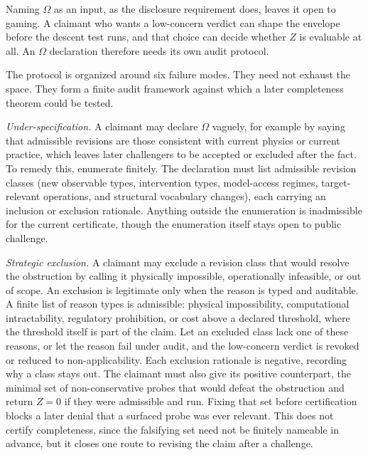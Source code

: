 \documentclass[11pt]{article}
\begin{document}
Naming $\Omega$ as an input, as the disclosure requirement does, leaves it open
to gaming. A claimant who wants a low-concern verdict can shape the envelope
before the descent test runs, and that choice can decide whether $Z$ is
evaluable at all. An $\Omega$ declaration therefore needs its own audit
protocol.

The protocol is organized around six failure modes. They need not exhaust the
space. They form a finite audit framework against which a later completeness
theorem could be tested.

\emph{Under-specification.} A claimant may declare $\Omega$ vaguely, for example
by saying that admissible revisions are those consistent with current physics or
current practice, which leaves later challengers to be accepted or excluded
after the fact. To remedy this, enumerate finitely. The declaration must list
admissible revision classes (new observable types, intervention types,
model-access regimes, target-relevant operations, and structural vocabulary
changes), each carrying an inclusion or exclusion rationale. Anything outside the
enumeration is inadmissible for the current certificate, though the enumeration
itself stays open to public challenge.

\emph{Strategic exclusion.} A claimant may exclude a revision class that would
resolve the obstruction by calling it physically impossible, operationally
infeasible, or out of scope. An exclusion is legitimate only when the reason is
typed and auditable. A finite list of reason types is admissible: physical
impossibility, computational intractability, regulatory prohibition, or cost
above a declared threshold, where the threshold itself is part of the claim. Let
an excluded class lack one of these reasons, or let the reason fail under audit,
and the low-concern verdict is revoked or reduced to non-applicability.
Each exclusion rationale is negative, recording why a class stays out. The
claimant must also give its positive counterpart, the minimal set of
non-conservative probes that would defeat the obstruction and return $Z = 0$ if
they were admissible and run. Fixing that set before certification blocks a later
denial that a surfaced probe was ever relevant. This does not certify
completeness, since the falsifying set need not be finitely nameable in advance,
but it closes one route to revising the claim after a challenge.
\end{document}
